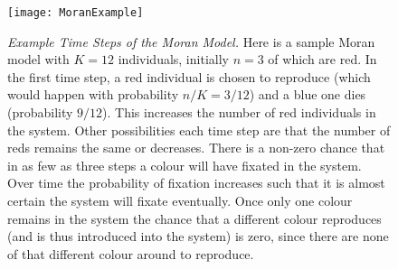 \begin{figure}[h]
	\centering
	\texttt{[image: MoranExample]}
	\caption{\emph{Example Time Steps of the Moran Model.} Here is a sample Moran model with $K=12$ individuals, initially $n=3$ of which are red. In the first time step, a red individual is chosen to reproduce (which would happen with probability $n/K=3/12$) and a blue one dies (probability $9/12$). This increases the number of red individuals in the system. Other possibilities each time step are that the number of reds remains the same or decreases. There is a non-zero chance that in as few as three steps a colour will have fixated in the system. Over time the probability of fixation increases such that it is almost certain the system will fixate eventually. Once only one colour remains in the system the chance that a different colour reproduces (and is thus introduced into the system) is zero, since there are none of that different colour around to reproduce. } \label{Moranfig} %
\end{figure}

